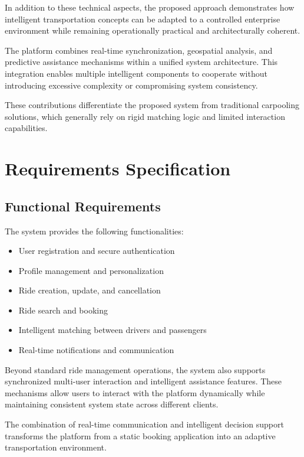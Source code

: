 In addition to these technical aspects, the proposed approach demonstrates how intelligent transportation concepts can be adapted to a controlled enterprise environment while remaining operationally practical and architecturally coherent.

The platform combines real-time synchronization, geospatial analysis, and predictive assistance mechanisms within a unified system architecture. This integration enables multiple intelligent components to cooperate without introducing excessive complexity or compromising system consistency.

These contributions differentiate the proposed system from traditional carpooling solutions, which generally rely on rigid matching logic and limited interaction capabilities.

\section{Requirements Specification}

\subsection{Functional Requirements}

The system provides the following functionalities:

\begin{itemize}
    \item User registration and secure authentication
    \item Profile management and personalization
    \item Ride creation, update, and cancellation
    \item Ride search and booking
    \item Intelligent matching between drivers and passengers
    \item Real-time notifications and communication
\end{itemize}

Beyond standard ride management operations, the system also supports synchronized multi-user interaction and intelligent assistance features. These mechanisms allow users to interact with the platform dynamically while maintaining consistent system state across different clients.

The combination of real-time communication and intelligent decision support transforms the platform from a static booking application into an adaptive transportation environment.

